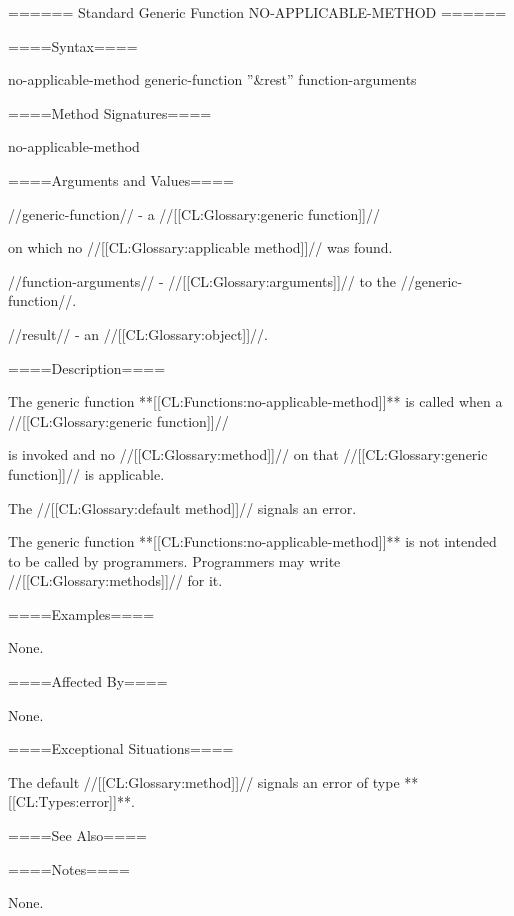 ====== Standard Generic Function NO-APPLICABLE-METHOD ======

====Syntax====

\DefgenWithValues no-applicable-method {generic-function ''&rest'' function-arguments} {}

====Method Signatures====

\Defmeth no-applicable-method {}

====Arguments and Values====


//generic-function// - a //[[CL:Glossary:generic function]]//

on which no //[[CL:Glossary:applicable method]]// was found.

//function-arguments// - //[[CL:Glossary:arguments]]// to the //generic-function//.

//result// - an //[[CL:Glossary:object]]//.

====Description====

The generic function **[[CL:Functions:no-applicable-method]]** is called when a //[[CL:Glossary:generic function]]//

is invoked and no //[[CL:Glossary:method]]// on that //[[CL:Glossary:generic function]]// is applicable.

The //[[CL:Glossary:default method]]// signals an error.

The generic function **[[CL:Functions:no-applicable-method]]** is not intended to be called by programmers. Programmers may write //[[CL:Glossary:methods]]// for it.

====Examples====

None.

====Affected By====

None.

====Exceptional Situations====

The default //[[CL:Glossary:method]]// signals an error of type **[[CL:Types:error]]**.

====See Also====

====Notes====

None.


